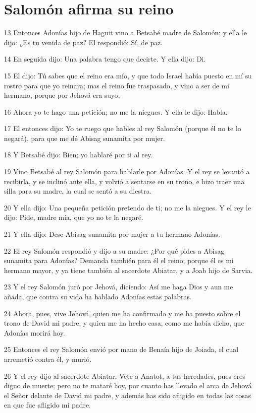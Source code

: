 \section*{Salomón afirma su reino}

\par 13 Entonces Adonías hijo de Haguit vino a Betsabé madre de Salomón; y ella le dijo: ¿Es tu venida de paz? El respondió: Sí, de paz.
\par 14 En seguida dijo: Una palabra tengo que decirte. Y ella dijo: Di.
\par 15 El dijo: Tú sabes que el reino era mío, y que todo Israel había puesto en mí su rostro para que yo reinara; mas el reino fue traspasado, y vino a ser de mi hermano, porque por Jehová era suyo.
\par 16 Ahora yo te hago una petición; no me la niegues. Y ella le dijo: Habla.
\par 17 El entonces dijo: Yo te ruego que hables al rey Salomón (porque él no te lo negará), para que me dé Abisag sunamita por mujer.
\par 18 Y Betsabé dijo: Bien; yo hablaré por ti al rey.
\par 19 Vino Betsabé al rey Salomón para hablarle por Adonías. Y el rey se levantó a recibirla, y se inclinó ante ella, y volvió a sentarse en su trono, e hizo traer una silla para su madre, la cual se sentó a su diestra.
\par 20 Y ella dijo: Una pequeña petición pretendo de ti; no me la niegues. Y el rey le dijo: Pide, madre mía, que yo no te la negaré.
\par 21 Y ella dijo: Dese Abisag sunamita por mujer a tu hermano Adonías.
\par 22 El rey Salomón respondió y dijo a su madre: ¿Por qué pides a Abisag sunamita para Adonías? Demanda también para él el reino; porque él es mi hermano mayor, y ya tiene también al sacerdote Abiatar, y a Joab hijo de Sarvia.
\par 23 Y el rey Salomón juró por Jehová, diciendo: Así me haga Dios y aun me añada, que contra su vida ha hablado Adonías estas palabras.
\par 24 Ahora, pues, vive Jehová, quien me ha confirmado y me ha puesto sobre el trono de David mi padre, y quien me ha hecho casa, como me había dicho, que Adonías morirá hoy.
\par 25 Entonces el rey Salomón envió por mano de Benaía hijo de Joiada, el cual arremetió contra él, y murió.
\par 26 Y el rey dijo al sacerdote Abiatar: Vete a Anatot, a tus heredades, pues eres digno de muerte; pero no te mataré hoy, por cuanto has llevado el arca de Jehová el Señor delante de David mi padre, y además has sido afligido en todas las cosas en que fue afligido mi padre. 

